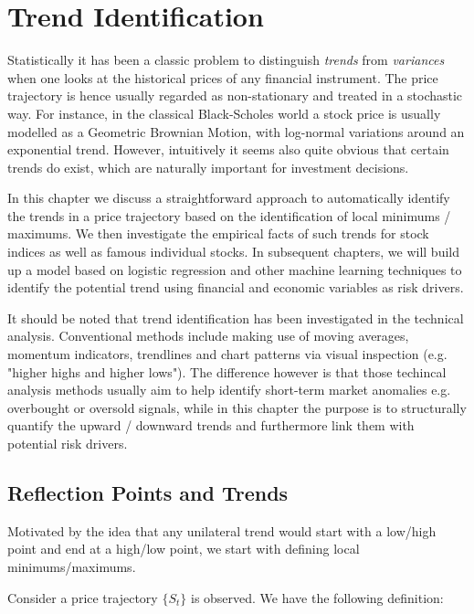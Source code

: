 \chapter{Trend Identification}

Statistically it has been a classic problem to distinguish \textit{trends} from \textit{variances} when one looks at the historical prices of any financial instrument. The price trajectory is hence usually regarded as non-stationary and treated in a stochastic way. For instance, in the classical Black-Scholes world a stock price is usually modelled as a Geometric Brownian Motion, with log-normal variations around an exponential trend. However, intuitively it seems also quite obvious that certain trends do exist, which are naturally important for investment decisions.

In this chapter we discuss a straightforward approach to automatically identify the trends in a price trajectory based on the identification of local minimums / maximums. We then investigate the empirical facts of such trends for stock indices as well as famous individual stocks. In subsequent chapters, we will build up a model based on logistic regression and other machine learning techniques to identify the potential trend using financial and economic variables as risk drivers. 

It should be noted that trend identification has been investigated in the technical analysis. Conventional methods include making use of moving averages, momentum indicators, trendlines and chart patterns via visual inspection (e.g. "higher highs and higher lows"). The difference however is that those techincal analysis methods usually aim to help identify short-term market anomalies e.g. overbought or oversold signals, while in this chapter the purpose is to structurally quantify the upward / downward trends and furthermore link them with potential risk drivers. 

\section{Reflection Points and Trends}\label{Definitions}

Motivated by the idea that any unilateral trend would start with a low/high point and end at a high/low point, we start with defining local minimums/maximums. 

Consider a price trajectory $\{S_t\}$ is observed. We have the following definition: 


